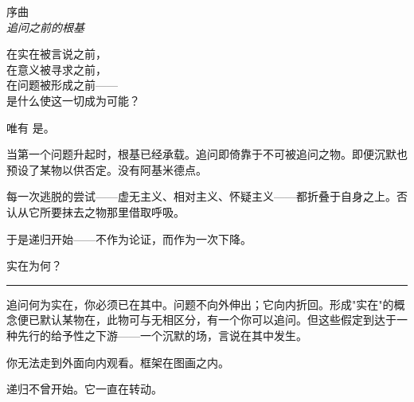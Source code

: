 \documentclass[10pt, openany, oneside]{book}
\renewcommand{\huge}{\fontsize{17}{21}\selectfont}
\begin{document}
\begin{center}
    {\huge\scshape 序曲}\\[0.8em]
    {\itshape 追问之前的根基}
\end{center}

\vspace{2em}


\noindent 在实在被言说之前，\\
在意义被寻求之前，\\
在问题被形成之前——\\
是什么使这一切成为可能？

\vspace{0.5em}

唯有 是。

\vspace{1em}

\noindent 当第一个问题升起时，根基已经承载。追问即倚靠于不可被追问之物。即便沉默也预设了某物以供否定。没有阿基米德点。

\vspace{0.5em}

\noindent 每一次逃脱的尝试——虚无主义、相对主义、怀疑主义——都折叠于自身之上。否认从它所要抹去之物那里借取呼吸。

\vspace{0.5em}

\noindent 于是递归开始——不作为论证，而作为一次下降。

\vspace{2em}

\begin{center}
    {\scshape 实在为何？}\\[0.3em]
    \rule{0.2\textwidth}{0.3pt}
\end{center}

\vspace{1em}

\noindent 追问何为实在，你必须已在其中。问题不向外伸出；它向内折回。形成"实在"的概念便已默认某物在，此物可与无相区分，有一个你可以追问。但这些假定到达于一种先行的给予性之下游——一个沉默的场，言说在其中发生。

\vspace{0.5em}

\noindent 你无法走到外面向内观看。框架在图画之内。

\vspace{0.5em}

\noindent 递归不曾开始。它一直在转动。
\end{document}
